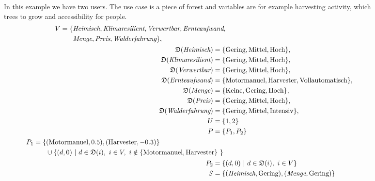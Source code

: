 \begin{figure}
    \begin{mdframed}[frametitle={Example for Forest Use Case}]
        In this example we have two users. The use case is a piece of forest and variables are for example harvesting activity, which trees to grow and accessibility for people.
        \begin{align}
            \begin{split}
                V = \{ & \textit{Heimisch}, \textit{Klimaresilient}, \textit{Verwertbar}, \textit{Ernteaufwand}, \\
                & \textit{Menge}, \textit{Preis}, \textit{Walderfahrung} \},
            \end{split} \notag \\
            \mathfrak{D}(\textit{Heimisch}) =  \{ & \text{Gering}, \text{Mittel}, \text{Hoch}\}, \notag \\
            \mathfrak{D}(\textit{Klimaresilient}) = \{ & \text{Gering}, \text{Mittel}, \text{Hoch}\}, \notag \\
            \mathfrak{D}(\textit{Verwertbar}) = \{ & \text{Gering}, \text{Mittel}, \text{Hoch}\}, \notag \\
            \mathfrak{D}(\textit{Ernteaufwand}) = \{ & \text{Motormanuel}, \text{Harvester}, \text{Vollautomatisch}\}, \notag \\
            \mathfrak{D}(\textit{Menge}) = \{ & \text{Keine}, \text{Gering}, \text{Hoch}\}, \notag \\
            \mathfrak{D}(\textit{Preis}) = \{ & \text{Gering}, \text{Mittel}, \text{Hoch}\}, \notag\\
            \mathfrak{D}(\textit{Walderfahrung}) = \{ & \text{Gering}, \text{Mittel}, \text{Intensiv}\},\notag \\
            U = \{ & 1,2\} \notag\\
            P = \{ & P_1, P_2\} \notag\\
            \begin{split}
                P_1 = \{ & (\text{Motormanuel}, 0.5), (\text{Harvester}, -0.3) \} \\ 
                & \cup \{ (d,0)\ |\ d \in \mathfrak{D}(i),\ i \in V,\ i \notin \{ \text{Motormanuel}, \text{Harvester}\} \ \} \ 
            \end{split} \notag \\
            P_2 = \{ & (d,0)\ |\ d \in \mathfrak{D}(i),\ i \in V \} \notag \\
            S  =  \{ & (\textit{Heimisch}, \text{Gering}), (\textit{Menge}, \text{Gering}) \} \notag \\

\end{align}
\end{mdframed}
\end{figure}
